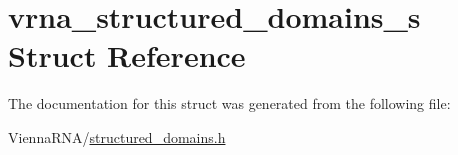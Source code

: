\hypertarget{structvrna__structured__domains__s}{}\section{vrna\+\_\+structured\+\_\+domains\+\_\+s Struct Reference}
\label{structvrna__structured__domains__s}


The documentation for this struct was generated from the following file\+:\begin{DoxyCompactItemize}
\item 
Vienna\+R\+N\+A/\hyperlink{structured__domains_8h}{structured\+\_\+domains.\+h}\end{DoxyCompactItemize}
